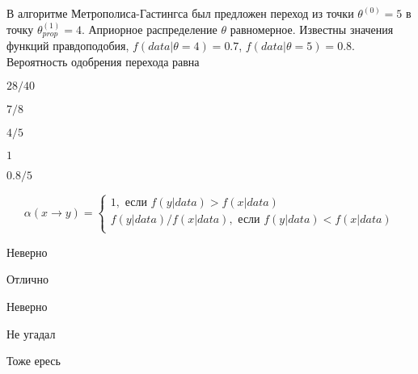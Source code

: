 
\begin{question}
В алгоритме Метрополиса-Гастингса был предложен переход из точки
\(\theta^{(0)}=5\) в точку \(\theta^{(1)}_{prop}=4\). Априорное
распределение \(\theta\) равномерное. Известны значения функций
правдоподобия, \(f(data|\theta=4)=0.7\), \(f(data|\theta=5)=0.8\).
Вероятность одобрения перехода равна
\begin{answerlist}
  \item \(28/40\)
  \item \(7/8\)
  \item \(4/5\)
  \item \(1\)
  \item \(0.8/5\)
\end{answerlist}
\end{question}

\begin{solution}
\[
\alpha(x \to y) = \begin{cases}
1, \text{ если } f(y|data) > f(x|data) \\
f(y|data) / f(x|data), \text{ если } f(y|data) < f(x|data) \\
\end{cases}
\]
\begin{answerlist}
  \item Неверно
  \item Отлично
  \item Неверно
  \item Не угадал
  \item Тоже ересь
\end{answerlist}
\end{solution}

